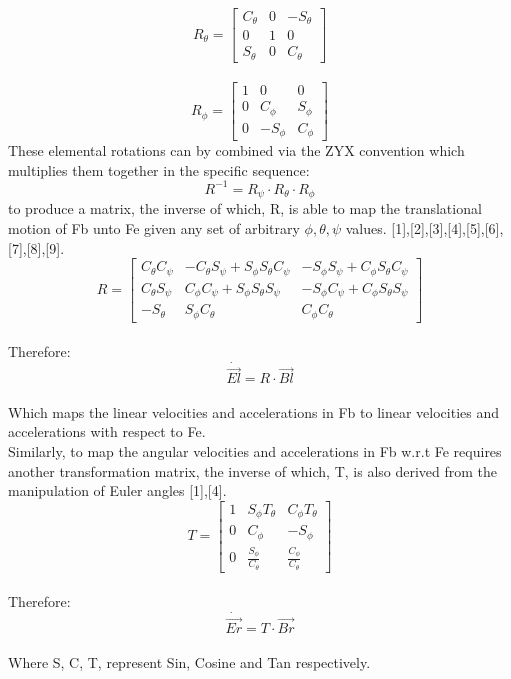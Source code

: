 \documentclass[12pt,a4paper,twoside]{report}
\begin{document}
			\\
			\begin{equation}
				R_\theta = 
				\begin{bmatrix}
					C_\theta & 0 & -S_\theta \\
					0 & 1 & 0 \\
					S_\theta & 0 & C_\theta
				\end{bmatrix}
			\end{equation}
			\\
			\begin{equation}
				R_\phi = 
				\begin{bmatrix}
					1 & 0 & 0 \\
					0 & C_\phi & S_\phi  \\
					0 & -S_\phi & C_\phi
				\end{bmatrix}
			\end{equation}
			\space
			These elemental rotations can by combined via the ZYX convention which multiplies them together in the specific sequence:
			\[R^{-1} = R_\psi \cdot R_\theta \cdot R_\phi\]
			to produce a matrix, the inverse of which, R, is able to map the translational motion of Fb unto Fe given any set of arbitrary \(\phi, \theta, \psi\) values. [1],[2],[3],[4],[5],[6],[7],[8],[9].
			\\
			\begin{equation}
				R = 
				\begin{bmatrix}
					C_\theta C_\psi & -C_\theta S_\psi + S_\phi S_\theta C_\psi & -S_\phi S_\psi + C_\phi S_\theta C_\psi \\
					C_\theta S_\psi &  C_\phi C_\psi + S_\phi S_\theta S_\psi   & -S_\phi C_\psi + C_\phi S_\theta S_\psi \\
					-S_\theta       &  S_\phi C_\theta                          &  C_\phi C_\theta
				\end{bmatrix}
			\end{equation}
			\\
			Therefore: 
			\[ \dot{\vec{El}} = R \cdot \vec{Bl} \]
			\\
			Which maps the linear velocities and accelerations in Fb to linear velocities and accelerations with respect to Fe.
			\\
			Similarly, to map the angular velocities and accelerations in Fb w.r.t Fe requires another transformation matrix, the inverse of which, T, is also derived from the manipulation of Euler angles [1],[4]. 
			\\
			\begin{equation}
				T = 
				\begin{bmatrix}
					1 & S_\phi T_\theta & C_\phi T_\theta \\
					0 & C_\phi & -S_\phi\\
					0 & \frac{S_\phi}{C_\theta}  & \frac{C_\phi}{C_\theta}
				\end{bmatrix}
			\end{equation} 
			\\
			Therefore:
			\\
			\[\dot{\vec{Er}} = T \cdot \vec{Br} \]
			\\
			Where S, C, T, represent Sin, Cosine and Tan respectively.
				
\end{document}
